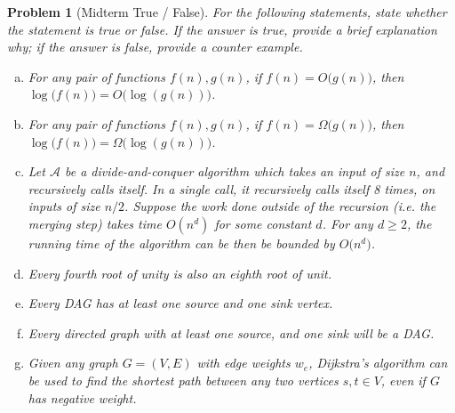 \documentclass[10pt]{article}
\newtheorem{problem}{\sc\color{cit}Problem}
\begin{document}
\newpage
\begin{problem}[Midterm True / False] 
For the following statements, state whether the statement is true or false. If the answer is true, provide a brief explanation why; if the answer is false, provide a counter example.
\begin{enumerate}[(a)]
\item For any pair of functions $f(n), g(n)$, if $f(n) = O\big( g(n) \big)$, then $\log\big( f(n) \big) = O\big( \log ( g(n)) \big)$.

\item For any pair of functions $f(n), g(n)$, if $f(n) = \Omega\big( g(n) \big)$, then $\log\big( f(n) \big) = \Omega\big( \log( g(n)) \big)$.

\item Let $\mathcal{A}$ be a divide-and-conquer algorithm which takes an input of size $n$, and recursively calls itself. In a single call, it recursively calls itself 8 times, on inputs of size $n / 2$. Suppose the work done outside of the recursion (i.e. the merging step) takes time $O(n^d)$ for some constant $d$. For any $d \geq 2$, the running time of the algorithm can be then be bounded by $O\big( n^d \big)$.

\item Every fourth root of unity is also an eighth root of unit.

\item Every DAG has at least one source and one sink vertex.

\item Every directed graph with at least one source, and one sink will be a DAG.

\item Given any graph $G = (V, E)$ with edge weights $w_e$, Dijkstra's algorithm can be used to find the shortest path between any two vertices $s, t \in V$, even if $G$ has negative weight.
\end{enumerate}
    
\end{problem}
\end{document}
